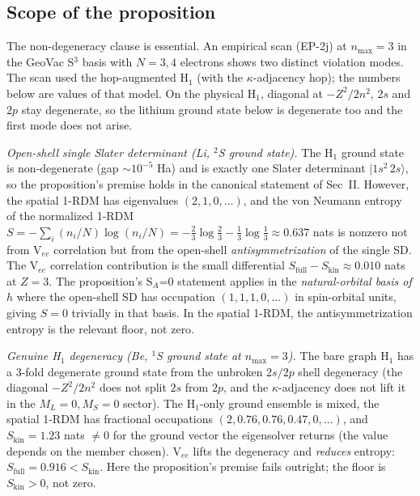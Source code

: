\documentclass[twocolumn,pra,amsmath,amssymb,superscriptaddress]{revtex4-2}
\begin{document}
\subsection{Scope of the proposition}
\label{sec:scope}

The non-degeneracy clause is essential.  An empirical scan
(EP-2j) at $n_{\max}=3$ in the GeoVac S$^{3}$ basis with
$N=3,4$ electrons shows two distinct violation modes.  The scan
used the hop-augmented H$_{1}$ (with the $\kappa$-adjacency hop); the
numbers below are values of that model.  On the physical H$_{1}$, diagonal at
$-Z^{2}/2n^{2}$, $2s$ and $2p$ stay degenerate, so the lithium ground
state below is degenerate too and the first mode does not arise.

\emph{Open-shell single Slater determinant (Li, $^{2}$S
ground state).}  The H$_{1}$ ground state is non-degenerate
(gap $\sim 10^{-5}$ Ha) and is exactly one Slater determinant
$|1s^{2}\,2s\rangle$, so the proposition's premise holds in
the canonical statement of Sec~II.  However, the spatial
1-RDM has eigenvalues $(2, 1, 0, \ldots)$, and the von
Neumann entropy of the normalized 1-RDM
$S = -\sum_i (n_i/N)\log(n_i/N) = -\tfrac{2}{3}\log\tfrac{2}{3}
- \tfrac{1}{3}\log\tfrac{1}{3} \approx 0.637$ nats is nonzero
not from V$_{ee}$ correlation but from the open-shell
\emph{antisymmetrization} of the single SD.  The V$_{ee}$
correlation contribution is the small differential
$S_{\mathrm{full}} - S_{\mathrm{kin}} \approx 0.010$ nats at
$Z=3$.  The proposition's S$_A$=0 statement applies in the
\emph{natural-orbital basis of $h$} where the open-shell SD
has occupation $(1, 1, 1, 0, \ldots)$ in spin-orbital units,
giving $S=0$ trivially in that basis.  In the spatial 1-RDM,
the antisymmetrization entropy is the relevant floor, not
zero.

\emph{Genuine H$_{1}$ degeneracy (Be, $^{1}$S ground state at
$n_{\max}=3$).}  The bare graph H$_{1}$ has a 3-fold
degenerate ground state from the unbroken $2s/2p$ shell
degeneracy (the diagonal $-Z^{2}/2n^{2}$ does not split
$2s$ from $2p$, and the $\kappa$-adjacency does not lift it
in the $M_L=0, M_S=0$ sector).  The H$_{1}$-only ground
ensemble is mixed, the spatial 1-RDM has fractional
occupations $(2, 0.76, 0.76, 0.47, 0, \ldots)$, and
$S_{\mathrm{kin}} = 1.23$ nats $\neq 0$ for the ground vector the
eigensolver returns (the value depends on the member chosen).  V$_{ee}$ lifts the
degeneracy and \emph{reduces} entropy:
$S_{\mathrm{full}} = 0.916 < S_{\mathrm{kin}}$.  Here the
proposition's premise fails outright; the floor is
$S_{\mathrm{kin}}>0$, not zero.
\end{document}

